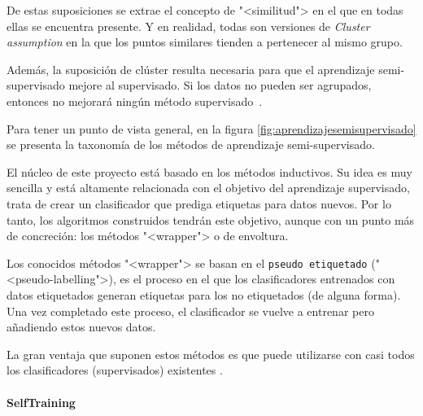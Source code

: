 De estas suposiciones se extrae el concepto de "<similitud"> en el que en todas
ellas se encuentra presente. Y en realidad, todas son versiones de
\textit{Cluster assumption} en la que los puntos similares tienden a pertenecer
al mismo grupo. 

Además, la suposición de clúster resulta necesaria para que el aprendizaje
semi-supervisado mejore al supervisado. Si los datos no pueden ser agrupados,
entonces no mejorará ningún método supervisado~\cite{vanEngelen2020}.


Para tener un punto de vista general, en la figura \ref{fig:aprendizajesemisupervisado} se presenta la
taxonomía de los métodos de aprendizaje semi-supervisado.


El núcleo de este proyecto está basado en los métodos inductivos. Su idea es muy
sencilla y está altamente relacionada con el objetivo del aprendizaje
supervisado, trata de crear un clasificador que prediga etiquetas para datos
nuevos. Por lo tanto, los algoritmos construidos tendrán este objetivo, aunque
con un punto más de concreción: los métodos "<wrapper"> o de envoltura.

Los conocidos métodos "<wrapper"> se basan en el \texttt{pseudo etiquetado}
("<pseudo-labelling">), es el proceso en el que los clasificadores entrenados
con datos etiquetados generan etiquetas para los no etiquetados (de alguna
forma). Una vez completado este proceso, el clasificador se vuelve a entrenar
pero añadiendo estos nuevos datos.

La gran ventaja que suponen estos métodos es que puede utilizarse con casi todos
los clasificadores (supervisados) existentes \cite{vanEngelen2020}.

\paragraph{SelfTraining}